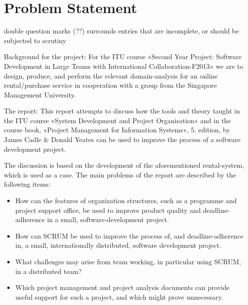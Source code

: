 \section{Problem Statement}
\label{sec:problemstatement}
double question marks (??) surrounds entries that are incomplete, or should be
subjected to scrutiny

Background for the project:
For the ITU course »Second Year Project: Software Development in Large Teams with
International Collaboration-F2013«
we are to design, produce, and perform the relevant domain-analysis for
an online rental/purchase service in cooperation with a group from the Singapore
Management University.

The report:
This report attempts to discuss how the tools and theory taught in the
ITU course »System Development and Project Organisation« and in the
course book, »Project Management for Information Systems«, 5. edition, by 
James Cadle \& Donald Yeates can be used to improve the process of a software development project.

The discussion is based on the development of the aforementioned
rental-system, which is used as a case.
The main problems of the report are described by the following items:
\begin{itemize}
\item How can the features of organization structures, such as a
programme and project support office, be used to improve
product quality and deadline-adherence in a small,
software-development project.

\item How can SCRUM be used to improve the process of, and 
deadline-adherence in, a small, internationally distributed,
software development project.

\item What challenges may arise from team working, in particular
using SCRUM, in a distributed team?

\item Which project management and project analysis documents can
provide useful support for such a project, and which might
prove unnecessary.
\end{itemize}
